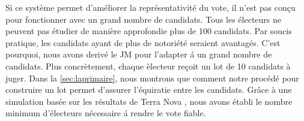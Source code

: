 \documentclass[conference]{IEEEtran}
\begin{document}
Si ce syst\`eme permet d'am\'eliorer la repr\'esentativit\'e du vote, il n'est pas con\c{c}u pour fonctionner avec un grand nombre de candidats. Tous les \'electeurs ne peuvent pas \'etudier de mani\`ere approfondie plus de 100 candidats. Par soucis pratique, les candidats ayant de plus de notori\'et\'e seraient avantag\'es. C'est pourquoi, nous avons deriv\'e le JM pour l'adapter \'a un grand nombre de candidats. Plus concr\`etement, chaque \`electeur re\c{c}oit un lot de 10 candidats \`a juger. Dans la \cref{sec:laprimaire}, nous montrons que comment notre proc\'ed\'e pour construire un lot permet d'assurer l'\'equiratie entre les candidats. Gr\^ace \`a une simulation bas\'ee sur les r\'esultats de Terra Nova \cite{terra-nova}, nous avons \'etabli le nombre minimum d'\'electeurs n\'ecessaire \'a rendre le vote fiable.
\end{document}
